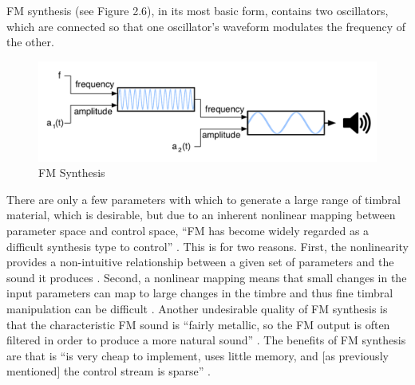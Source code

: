 \documentclass[12pt]{report} 	%
\numberwithin{figure}{chapter}
\numberwithin{table}{chapter}
\numberwithin{equation}{chapter}
\begin{document}
\begin{flushleft}
FM synthesis (see Figure 2.6), in its most basic form, contains two oscillators, which are connected so that one oscillator's waveform modulates the frequency of the other. 
\begin{figure}[h!]
\begin{center}
\includegraphics[scale=0.65]{FMSynthesis}
\caption[FM synthesis]{FM Synthesis}
\end{center}
\end{figure}
There are only a few parameters with which to generate a large range of timbral material, which is desirable, but due to an inherent nonlinear mapping between parameter space and control space, ``FM has become widely regarded as a difficult synthesis type to control'' \cite{Mitchell:2007fe}. This is for two reasons. First, the nonlinearity provides a non-intuitive relationship between a given set of parameters and the sound it produces \cite[p. 45]{Nicol:2005rp}. Second, a  nonlinear mapping means that small changes in the input parameters can map to large changes in the timbre and thus fine timbral manipulation can be difficult \cite[p. 2]{Jaffe:1995fv}. Another undesirable quality of FM synthesis is that the characteristic FM sound is ``fairly metallic, so the FM output is often filtered in order to produce a more natural sound'' \cite[p. 45]{Nicol:2005rp}. The benefits of FM synthesis are that is ``is very cheap to implement, uses little memory, and [as previously mentioned] the control stream is sparse'' \cite[p. 92]{Tolonen:1998bh}.


\end{flushleft}
\end{document}
